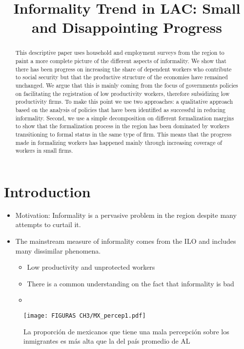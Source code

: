 \documentclass[english]{article}
\begin{document}
\title{Informality Trend in LAC: Small and Disappointing Progress }
\maketitle
\begin{abstract}
    This descriptive paper uses household and employment surveys from the region to paint a more complete picture of the different aspects of informality. We show that there has been progress on increasing the share of dependent workers who contribute to social security but that the productive structure of the economies have remained unchanged. We argue that this is mainly coming from the focus of governments policies on facilitating the registration of low productivity workers, therefore subsidizing low productivity firms. To make this point we use two approaches: a qualitative approach based on the analysis of policies that have been identified as successful in reducing informality. Second, we use a simple decomposition on different formalization margins to show that the formalization process in the region has been dominated by workers transitioning to formal status in the same type of firm. This means that the progress made in formalizing workers has happened mainly through increasing coverage of workers in small firms. 
\end{abstract}
\section{Introduction}
\begin{itemize}
    \item Motivation: Informality is a pervasive problem in the region despite many attempts to curtail it. 
    \item The mainstream measure of informality comes from the ILO and includes many dissimilar phenomena. 
    \begin{itemize}
        \item Low productivity and unprotected workers
    \item There is a common understanding on the fact that informality is bad
    \item 
    \end{itemize}
\end{itemize}

\begin{figure} [H]
    \raggedright
    \caption{La proporción de mexicanos que tiene una mala percepción sobre los inmigrantes es más alta que la del país promedio de AL}
    \texttt{[image: FIGURAS CH3/MX\_percep1.pdf]}
    
    \footnotesize{}
    \label{fig:MX_percep1}
\end{figure}
\end{document}
